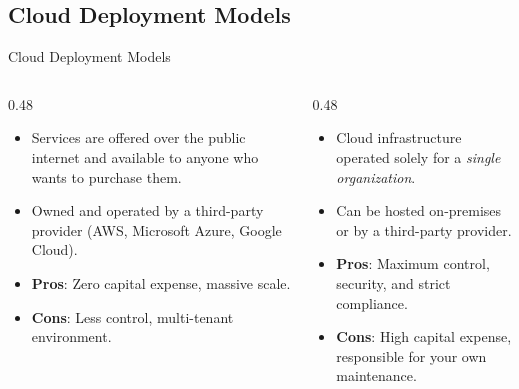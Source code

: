 \documentclass[aspectratio=169]{beamer}  %
\begin{document}
\subsection{Cloud Deployment Models}
\begin{frame}[t]{Cloud Deployment Models}
    \begin{columns}[T]
        \begin{column}{0.48\textwidth}
            \begin{block}{}
                \footnotesize
                \begin{itemize}
                    \item Services are offered over the public internet and available to anyone who wants to purchase them.
                    \item Owned and operated by a third-party provider (AWS, Microsoft Azure, Google Cloud).
                    \item \textbf{Pros}: Zero capital expense, massive scale.
                    \item \textbf{Cons}: Less control, multi-tenant environment.
                \end{itemize}
            \end{block}
        \end{column}
        \begin{column}{0.48\textwidth}
            \begin{block}{}
                \footnotesize
                \begin{itemize}
                    \item Cloud infrastructure operated solely for a \textit{single organization}.
                    \item Can be hosted on-premises or by a third-party provider.
                    \item \textbf{Pros}: Maximum control, security, and strict compliance.
                    \item \textbf{Cons}: High capital expense, responsible for your own maintenance.
                \end{itemize}
            \end{block}
        \end{column}
    \end{columns}
\end{frame}
\end{document}
